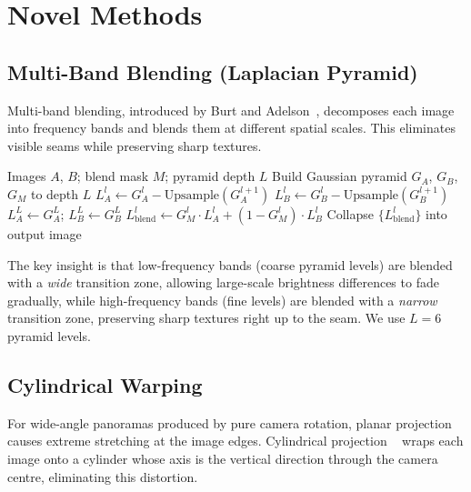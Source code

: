 \documentclass[conference]{IEEEtran}
\begin{document}
\section{Novel Methods}
\label{sec:novel}

\subsection{Multi-Band Blending (Laplacian Pyramid)}

Multi-band blending, introduced by Burt and Adelson~\cite{burt1983},
decomposes each image into frequency bands and blends them at different
spatial scales. This eliminates visible seams while preserving sharp textures.

\begin{algorithm}[H]
\caption{Multi-Band Blending}
\label{alg:multiband}
\begin{algorithmic}[1]
\Require Images $A$, $B$; blend mask $M$; pyramid depth $L$
\State Build Gaussian pyramid $G_A$, $G_B$, $G_M$ to depth $L$
  \State $L_A^l \gets G_A^l - \text{Upsample}(G_A^{l+1})$
  \State $L_B^l \gets G_B^l - \text{Upsample}(G_B^{l+1})$
\EndFor
\State $L_A^L \gets G_A^L$; \quad $L_B^L \gets G_B^L$
  \State $L_{\text{blend}}^l \gets G_M^l \cdot L_A^l + (1 - G_M^l) \cdot L_B^l$
\EndFor
\State Collapse $\{L_{\text{blend}}^l\}$ into output image
\end{algorithmic}
\end{algorithm}

The key insight is that low-frequency bands (coarse pyramid levels) are
blended with a \emph{wide} transition zone, allowing large-scale brightness
differences to fade gradually, while high-frequency bands (fine levels) are
blended with a \emph{narrow} transition zone, preserving sharp textures right
up to the seam. We use $L=6$ pyramid levels.


\subsection{Cylindrical Warping}

For wide-angle panoramas produced by pure camera rotation, planar projection
causes extreme stretching at the image edges. Cylindrical projection
~\cite{szeliski2006} wraps each image onto a cylinder whose axis is the
vertical direction through the camera centre, eliminating this distortion.
\end{document}

